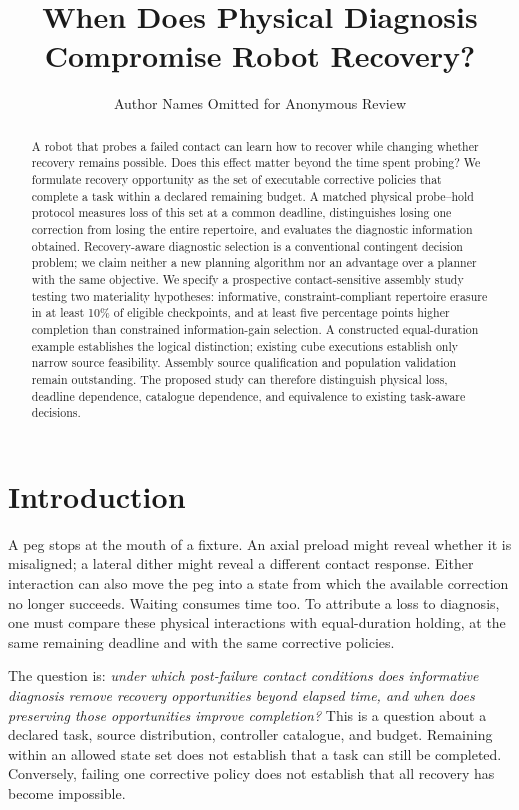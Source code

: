 \documentclass[conference]{IEEEtran}
\begin{document}
\title{When Does Physical Diagnosis Compromise Robot Recovery?}
\author{Author Names Omitted for Anonymous Review}
\maketitle
\begin{abstract}
A robot that probes a failed contact can learn how to recover while changing whether recovery remains possible. Does this effect matter beyond the time spent probing? We formulate recovery opportunity as the set of executable corrective policies that complete a task within a declared remaining budget. A matched physical probe--hold protocol measures loss of this set at a common deadline, distinguishes losing one correction from losing the entire repertoire, and evaluates the diagnostic information obtained. Recovery-aware diagnostic selection is a conventional contingent decision problem; we claim neither a new planning algorithm nor an advantage over a planner with the same objective. We specify a prospective contact-sensitive assembly study testing two materiality hypotheses: informative, constraint-compliant repertoire erasure in at least 10\% of eligible checkpoints, and at least five percentage points higher completion than constrained information-gain selection. A constructed equal-duration example establishes the logical distinction; existing cube executions establish only narrow source feasibility. Assembly source qualification and population validation remain outstanding. The proposed study can therefore distinguish physical loss, deadline dependence, catalogue dependence, and equivalence to existing task-aware decisions.
\end{abstract}

\section{Introduction}
A peg stops at the mouth of a fixture. An axial preload might reveal whether it is misaligned; a lateral dither might reveal a different contact response. Either interaction can also move the peg into a state from which the available correction no longer succeeds. Waiting consumes time too. To attribute a loss to diagnosis, one must compare these physical interactions with equal-duration holding, at the same remaining deadline and with the same corrective policies.

The question is: \emph{under which post-failure contact conditions does informative diagnosis remove recovery opportunities beyond elapsed time, and when does preserving those opportunities improve completion?} This is a question about a declared task, source distribution, controller catalogue, and budget. Remaining within an allowed state set does not establish that a task can still be completed. Conversely, failing one corrective policy does not establish that all recovery has become impossible.
\end{document}
